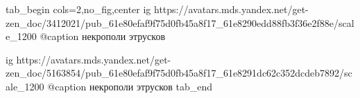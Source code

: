  
 
 
 
 

\ifcmt
tab_begin cols=2,no_fig,center
  ig https://avatars.mds.yandex.net/get-zen_doc/3412021/pub_61e80efaf9f75d0fb45a8f17_61e8290edd88fb3f36e2f88e/scale_1200
  @caption некрополи этрусков

	ig https://avatars.mds.yandex.net/get-zen_doc/5163854/pub_61e80efaf9f75d0fb45a8f17_61e8291dc62c352dcdeb7892/scale_1200
  @caption некрополи этрусков
tab_end
\fi
